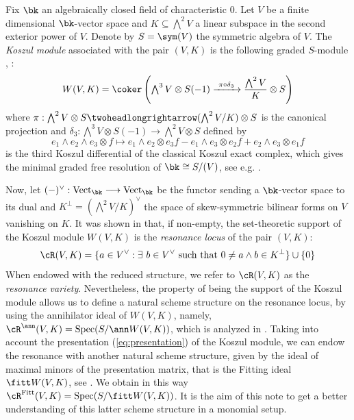 \documentclass[10pt, leqno]{amsart}
\begin{document}
Fix $\bk$ an algebraically closed field of characteristic $0$. Let $V$ be a finite dimensional $\bk$-vector space and $K \subseteq \bigwedge^2V$ a linear subspace in the second exterior power of $V$. Denote by $S = \sym(V)$ the symmetric algebra of $V$. The \emph{Koszul module} associated with the pair $(V,K)$ is the following graded $S$-module \cite[\S 2]{papadima_vanishing_2015}, \cite[Definition 2.1]{aprodu_topological_2022}:
\begin{equation} \label{eq:presentation}
W(V,K) = \coker \left( \displaystyle \textstyle{\bigwedge^3 V} \otimes S(-1) \xrightarrow{\ \pi\circ\delta_3\ } \displaystyle\frac{\textstyle{\bigwedge^2 V}}{K} \otimes S\right)   
\end{equation}
where $\pi: \bigwedge^2 V \otimes S \twoheadlongrightarrow (\bigwedge^2 V/K)\otimes S$ is the canonical projection and $\delta_3: \bigwedge^3 V \otimes S(-1) \longrightarrow \bigwedge^2 V \otimes S$ defined by 
\[
e_1 \wedge e_2 \wedge e_3 \otimes f \longmapsto e_1 \wedge e_2 \otimes e_3f - e_1 \wedge e_3 \otimes e_2f + e_2 \wedge e_3 \otimes e_1f
\]
is the third Koszul differential of the classical Koszul exact complex, which gives the minimal graded free resolution of $\bk \cong S/(V)$, see e.g. \cite{eisenbud_syzygies_2005}.

Now, let $(\--)^\vee: \operatorname{Vect}_\bk \longrightarrow \operatorname{Vect}_\bk$ be the functor sending a $\bk$-vector space to its dual and $K^\perp = (\bigwedge^2V/K)^\vee$ the space of skew-symmetric bilinear forms on $V$ vanishing on $K$. It was shown in \cite[Lemma 2.4]{papadima_vanishing_2015} that, if non-empty, the set-theoretic support of the Koszul module $W(V,K)$ is the \emph{resonance locus} of the pair $(V,K)$:
\begin{equation}
\cR(V,K) = \{a\in V^\vee : \exists \ b\in V^\vee \text{ such that } 0 \neq a\wedge b \in K^\perp \} \cup \{0 \}
\end{equation}
When endowed with the reduced structure, we refer to $\cR(V,K)$ as the \emph{resonance variety}. Nevertheless, the property of being the support of the Koszul module allows us to define a natural scheme structure on the resonance locus, by using the annihilator ideal of $W(V,K)$, namely, $\cR^{\ann}(V,K) = \operatorname{Spec}(S/\ann W(V,K))$, which is analyzed in \cite{aprodu_reduced_2024}. Taking into account the presentation (\ref{eq:presentation}) of the Koszul module, we can endow the resonance with another natural scheme structure, given by the ideal of maximal minors of the presentation matrix, that is the Fitting ideal $\fitt W(V,K)$, see \cite[\href{https://stacks.math.columbia.edu/tag/07Z6}{Tag 07Z6}]{stacks-project}. We obtain in this way $\cR^{\operatorname{Fitt}}(V,K) = \operatorname{Spec}(S/\fitt W(V,K))$. It is the aim of this note to get a better understanding of this latter scheme structure in a monomial setup.
\end{document}
